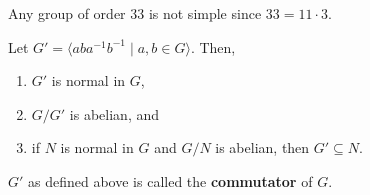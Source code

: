\begin{example}
	Any group of order 33 is not simple since $33=11\cdot 3$.
\end{example}

\begin{theorem}\label{thm:commutator}
	Let $G'=\langle aba^{-1}b^{-1}\mid a,b\in G\rangle$. Then,
	\begin{enumerate}
		\item $G'$ is normal in $G$,
		\item $G/G'$ is abelian, and
		\item if $N$ is normal in $G$ and $G/N$ is abelian, then $G'\subseteq N$.
	\end{enumerate}
\end{theorem}

$G'$ as defined above is called the \textbf{commutator} of $G$.

